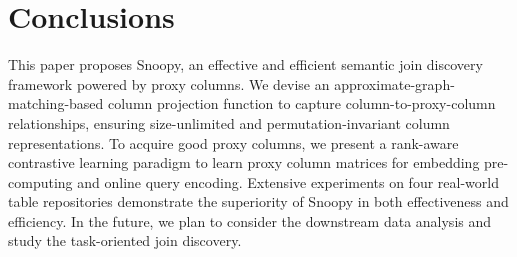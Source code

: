 \section{Conclusions}
\label{sec:conlusion}
This paper proposes \textsf{Snoopy}, an effective and efficient semantic join discovery framework powered by proxy columns.
We devise an approximate-graph-matching-based column projection function to capture column-to-proxy-column relationships, ensuring size-unlimited and permutation-invariant column representations.
To acquire good proxy columns, we present a rank-aware contrastive learning paradigm to learn proxy column matrices for embedding pre-computing and online query encoding.
Extensive experiments on four real-world table repositories demonstrate the superiority of \textsf{Snoopy} in both effectiveness and efficiency. In the future, we plan to consider the downstream data analysis and study the task-oriented join discovery.